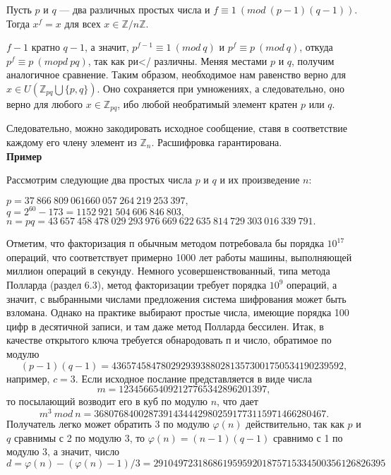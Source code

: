   Пусть $p$ и $q$ --- два различных простых числа и $f \equiv 1\ (mod\ (p-1)(q-1))$. Тогда $x^{f} = x$ для всех $x \in \mathbb{Z}/n\mathbb{Z}$.
\pagebreak
\newpage
\begin{myproof}
$f - 1$ кратно $q - 1$, а значит, $p^{f - 1} \equiv 1\ (mod\ q)$ и $p^f \equiv p\ (mod\ q)$, откуда $p^f \equiv p\ (mopd\ pq)$, так как ри</ различны. Меняя местами $p$ и $q$, получим аналогичное сравнение. Таким образом, необходимое
нам равенство верно для $x \in U(\mathbb{Z}_{pq} \bigcup \{p,q \})$. Оно сохраняется при умножениях, а следовательно, оно верно для любого $x \in \mathbb{Z}_{pq}$, ибо любой необратимый элемент кратен $p$ или $q$.
\end{myproof}
  Следовательно, можно закодировать исходное сообщение, ставя в
соответствие каждому его члену элемент из $\mathbb{Z}_n$. Расшифровка 
гарантирована.\\
\textbf{Пример} \par
  Рассмотрим следующие два простых числа $p$ и $q$ и их произведение $n$:
\begin{center}
$p = 37\ 866\ 809\ 061660\ 057\ 264\ 219\ 253\ 397,$ 
$q = 2^{60} - 173 = 1152\ 921\ 504\ 606\ 846\ 803,$ 
$n = pq = 43\ 657\ 458\ 478\ 029\ 293\ 976\ 669\ 622\ 635\ 814\ 729\ 303\ 016\ 339\ 791.$
\end{center}
Отметим, что факторизация п обычным методом потребовала бы 
порядка $10^{17}$ операций, что соответствует примерно 1000 лет работы 
машины, выполняющей миллион операций в секунду. Немного 
усовершенствованный, типа метода Полларда (раздел 6.3), метод факторизации
требует порядка $10^9$ операций, а значит, с выбранными числами 
предложения система шифрования может быть взломана. Однако на практике
выбирают простые числа, имеющие порядка 100 цифр в десятичной 
записи, и там даже метод Полларда бессилен. Итак, в качестве открытого
ключа требуется обнародовать п и число, обратимое по модулю
$$(p - 1)(q - 1) = 43 657 458 478 029 293 938 802 813 573 001750 534 190 239 592,$$
например, $c = 3$. Если исходное послание представляется в виде числа
$$m = 123 456 654 092127 765 342 896 201397,$$
то посылающий возводит его в куб по модулю $n$, что дает
$$m^{3}\ mod\ n = 36 807 684 002 873 914 344 429 802 591 773 115 971466 280 467.$$
Получатель легко может обратить 3 по модулю $\varphi (n)$ действительно,
так как $p$ и $q$ сравнимы с 2 по модулю 3, то $\varphi (n) = (n - 1)(q - 1)$
сравнимо с 1 по модулю 3, а значит, число
$$d = \varphi (n) - (\varphi (n) - 1)/3 = 29104 972 318 686 195 959 201875 715 334 500 356 126 826 395$$
\newpage
